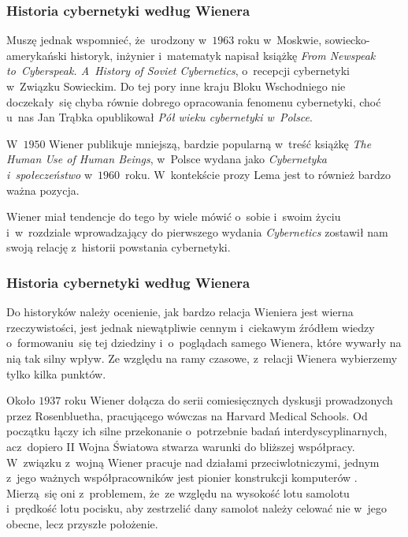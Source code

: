 \documentclass[10pt,t]{beamer}
\begin{document}
\begin{frame}
  \frametitle{Historia cybernetyki według Wienera}


  Muszę jednak wspomnieć, że~urodzony w~$1963$ roku w~Moskwie,
  sowiecko-amerykański historyk, inżynier i~matematyk
  napisał książkę
  {\textit{From Newspeak to~Cyberspeak. A~History of Soviet Cybernetics}},
  o~recepcji cybernetyki w~Związku Sowieckim. Do tej pory inne kraju
  Bloku Wschodniego nie doczekały~się chyba równie dobrego opracowania
  fenomenu cybernetyki, choć u~nas Jan Trąbka opublikował
  \textit{Pół wieku cybernetyki w~Polsce}.

  W~$1950$ Wiener publikuje mniejszą, bardzie
  popularną w~treść książkę
  {\textit{The Human Use of Human Beings}}, w~Polsce wydana jako
  \textit{Cybernetyka i~społeczeństwo} w~$1960$~roku. W~kontekście prozy
  Lema jest to również bardzo ważna pozycja.

  Wiener miał tendencje do tego by wiele mówić o~sobie i~swoim
  życiu i~w~rozdziale wprowadzający do pierwszego wydania
  \textit{Cybernetics} zostawił nam swoją relację z~historii powstania
  cybernetyki.

\end{frame}





\begin{frame}
  \frametitle{Historia cybernetyki według Wienera}


  Do historyków należy ocenienie, jak bardzo relacja
  Wieniera jest wierna rzeczywistości, jest jednak niewątpliwie cennym
  i~ciekawym źródłem wiedzy o~formowaniu~się tej dziedziny i~o~poglądach
  samego Wienera, które wywarły na nią tak silny wpływ. Ze względu na
  ramy czasowe, z~relacji Wienera wybierzemy tylko kilka punktów.

  Około $1937$ roku
  Wiener dołącza do serii comiesięcznych dyskusji prowadzonych przez
  Rosenbluetha, pracującego wówczas na Harvard Medical Schools. Od początku
  łączy ich silne przekonanie o~potrzebnie badań interdyscyplinarnych,
  acz~dopiero II Wojna Światowa stwarza warunki do bliższej współpracy.
  W~związku z~wojną Wiener pracuje nad działami przeciwlotniczymi, jednym
  z~jego ważnych współpracowników jest pionier konstrukcji komputerów
  . Mierzą~się oni z~problemem, że~ze względu na wysokość lotu
  samolotu i~prędkość lotu pocisku, aby zestrzelić dany samolot należy
  celować nie w~jego obecne, lecz przyszłe położenie.

\end{frame}
\end{document}
